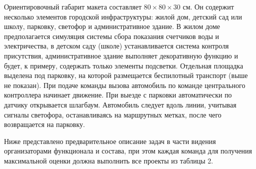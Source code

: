 Ориентировочный габарит макета составляет $80\times 80 \times 30$ см. Он содержит несколько элементов городской инфраструктуры: жилой дом, детский сад или школу, парковку, светофор и административное здание. В жилом доме предполагается симуляция системы сбора показания счетчиков воды и электричества, в детском саду (школе) устанавливается система контроля присутствия, административное здание выполняет декоративную функцию и будет, к примеру, содержать только элементы подсветки. Отдельная площадка выделена под парковку, на которой размещается беспилотный транспорт (выше не показан). При подаче команды вызова автомобиль по команде центрального контроллера начинает движение. При выезде с парковки автоматически по датчику открывается шлагбаум. Автомобиль следует вдоль линии, учитывая сигналы светофора, останавливаясь на маршрутных метках, после чего возвращается на парковку.

Ниже представлено предварительное описание задач в части видения организаторами функционала и состава, при этом каждая команда для получения максимальной оценки должна выполнить все проекты из таблицы 2.

